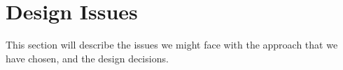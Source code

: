 \section[Issues]{Design Issues}

This section will describe the issues we might face with the approach that we have chosen, and the design decisions.